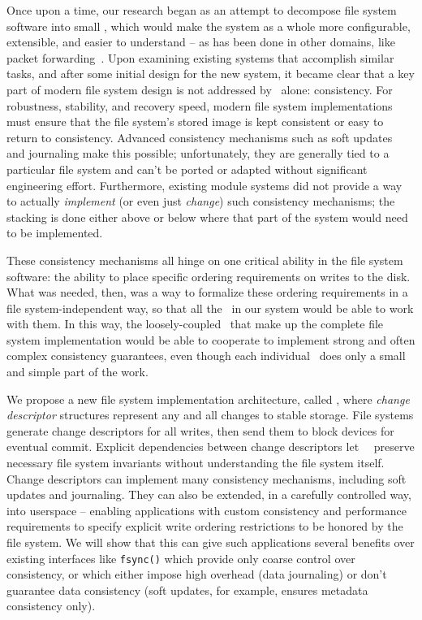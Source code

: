 Once upon a time, our research began as an attempt to decompose file system
software into small \modules, which would make the system as a whole more
configurable, extensible, and easier to understand -- as has been done in other
domains, like packet forwarding~\cite{kohler00click}. Upon examining existing
systems that accomplish similar tasks, and after some initial design for the new
system, it became clear that a key part of modern file system design is not
addressed by \modules\ alone: consistency. For robustness, stability, and
recovery speed, modern file system implementations must ensure that the file
system's stored image is kept consistent or easy to return to consistency.
Advanced consistency mechanisms such as soft updates~\cite{ganger00soft} and
journaling make this possible; unfortunately, they are generally tied to a
particular file system and can't be ported or adapted without significant
engineering effort. Furthermore, existing module systems did not provide a way
to actually \emph{implement} (or even just \emph{change}) such consistency
mechanisms; the stacking is done either above or below where that part of the
system would need to be implemented.

These consistency mechanisms all hinge on one critical ability in the file
system software: the ability to place specific ordering requirements on writes
to the disk. What was needed, then, was a way to formalize these ordering
requirements in a file system-independent way, so that all the \modules\ in our
system would be able to work with them. In this way, the loosely-coupled
\modules\ that make up the complete file system implementation would be able to
cooperate to implement strong and often complex consistency guarantees, even
though each individual \module\ does only a small and simple part of the work.


We propose a new file system implementation architecture, called \emph{\Kudos},
where \emph{change descriptor} structures represent any and all changes to
stable storage. File systems generate change descriptors for all writes, then
send them to block devices for eventual commit. Explicit dependencies between
change descriptors let \Kudos\ \modules\ preserve necessary file system
invariants without understanding the file system itself. Change descriptors can
implement many consistency mechanisms, including soft updates and journaling.
They can also be extended, in a carefully controlled way, into userspace --
enabling applications with custom consistency and performance requirements to
specify explicit write ordering restrictions to be honored by the file system.
We will show that this can give such applications several benefits over existing
interfaces like \texttt{fsync()} which provide only coarse control over
consistency, or which either impose high overhead (data journaling) or don't
guarantee data consistency (soft updates, for example, ensures metadata
consistency only).


